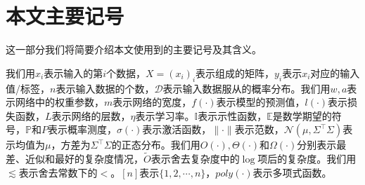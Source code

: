 


\section{本文主要记号}
这一部分我们将简要介绍本文使用到的主要记号及其含义。
\par
我们用$x_i$表示输入的第$i$个数据，$X = (x_i)_i$表示组成的矩阵，$y_i$表示$x_i$对应的输入值/标签，$n$表示输入数据的个数，$\mathcal{D}$表示输入数据服从的概率分布。我们用$w,a$表示网络中的权重参数，$m$表示网络的宽度，$f(\cdot)$表示模型的预测值，$l(\cdot)$表示损失函数，$L$表示网络的层数，$\eta$表示学习率。$\mathbb{I}$表示示性函数，$\mathbb{E}$是数学期望的符号，$\mathbb{P}$和$P$表示概率测度，$\sigma(\cdot)$表示激活函数，$\|\cdot\|$表示范数，$\mathcal{N}(\mu,\Sigma^\top \Sigma)$表示均值为$\mu$，方差为$\Sigma^\top\Sigma$的正态分布。我们用$O(\cdot),\Theta(\cdot)$和$\Omega(\cdot)$分别表示最差、近似和最好的复杂度情况，$\tilde{O}$表示舍去复杂度中的$\log$项后的复杂度。我们用$\lesssim$表示舍去常数下的$<$。$[n]$表示$\{1,2,\cdots,n\}$，$poly(\cdot)$表示多项式函数。